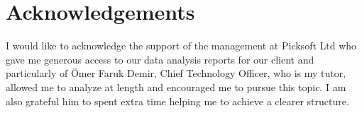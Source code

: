 \chapter{Acknowledgements}
I would like to acknowledge the support of the management at Picksoft Ltd who gave me generous access to our data analysis reports for our client and particularly of Ömer Faruk Demir, Chief Technology Officer, who is my tutor, allowed me to analyze at length and encouraged me to pursue this topic. I am also grateful him to spent extra time helping me to achieve a clearer structure.
